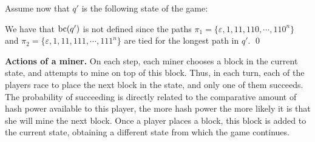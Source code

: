 \begin{example}
	Assume now that $q'$ is the following state of the game:
	\begin{center}
\end{center}
\vspace{-10pt}
We have that $\text{bc}(q')$ is not defined since the paths $\pi_1 = \{\varepsilon, 1, 11, 110, \cdots, 110^n\}$ and $\pi_2 = \{\varepsilon, 1, 11, 111, \cdots, 111^n\}$ are tied for the longest path in $q'$. \qed
\end{example}



\noindent
\textbf{Actions of a miner.} %
On each step, each miner
chooses a block in the current state, and attempts to mine on top of this block. Thus, in each turn, each of the players race to place the next block in the state, and only one of them succeeds. The probability of succeeding is directly related to the comparative amount of hash power available to this player, the more hash power the more likely it is that she will mine the next block. %
Once a player places a block, this block is added to the current state, obtaining a different state from which the game continues.

